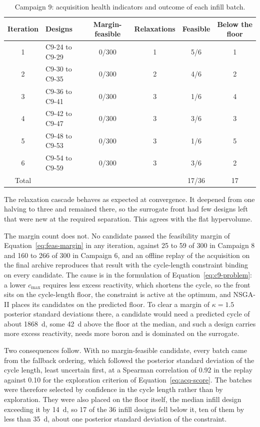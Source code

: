 \begin{table}[htbp]
  \centering
  \caption{Campaign 9: acquisition health indicators and outcome of each infill batch.}
  \label{tab:c9-acq-health}
  \small
  \begin{tabular}{@{}clcccc@{}}
    \toprule
    Iteration & Designs & Margin-feasible & Relaxations & Feasible & Below the floor \\
    \midrule
    1 & C9-24 to C9-29 & 0/300 & 1 & 5/6 & 1 \\
    2 & C9-30 to C9-35 & 0/300 & 2 & 4/6 & 2 \\
    3 & C9-36 to C9-41 & 0/300 & 3 & 1/6 & 4 \\
    4 & C9-42 to C9-47 & 0/300 & 3 & 3/6 & 3 \\
    5 & C9-48 to C9-53 & 0/300 & 3 & 1/6 & 5 \\
    6 & C9-54 to C9-59 & 0/300 & 3 & 3/6 & 2 \\
    \midrule
    Total &            &       &   & 17/36 & 17 \\
    \bottomrule
  \end{tabular}
\end{table}

The relaxation cascade behaves as expected at convergence. It deepened
from one halving to three and remained there, so the surrogate front
had few designs left that were new at the required separation. This
agrees with the flat hypervolume.

The margin count does not. No candidate passed the feasibility margin
of Equation~\eqref{eq:feas-margin} in any iteration, against 25 to 59 of
300 in Campaign 8 and 160 to 266 of 300 in Campaign 6, and an offline
replay of the acquisition on the final archive reproduces that result
with the cycle-length constraint binding on every candidate. The cause
is in the formulation of Equation~\eqref{eq:c9-problem}: a lower
$c_\mathrm{max}$ requires less excess reactivity, which shortens the
cycle, so the front sits on the cycle-length floor, the constraint is
active at the optimum, and NSGA-II places its candidates on the
predicted floor. To clear a margin of $\kappa = 1.5$ posterior standard
deviations there, a candidate would need a predicted cycle of about
\SI{1868}{d}, some \SI{42}{d} above the floor at the median, and such a
design carries more excess reactivity, needs more boron and is
dominated on the surrogate.

Two consequences follow. With no margin-feasible candidate, every batch
came from the fallback ordering, which followed the posterior standard
deviation of the cycle length, least uncertain first, at a Spearman
correlation of 0.92 in the replay against 0.10 for the exploration
criterion of Equation~\eqref{eq:acq-score}. The batches were therefore
selected by confidence in the cycle length rather than by exploration.
They were also placed on the floor itself, the median infill design
exceeding it by \SI{14}{d}, so 17 of the 36 infill designs fell below
it, ten of them by less than \SI{35}{d}, about one posterior standard
deviation of the constraint.

